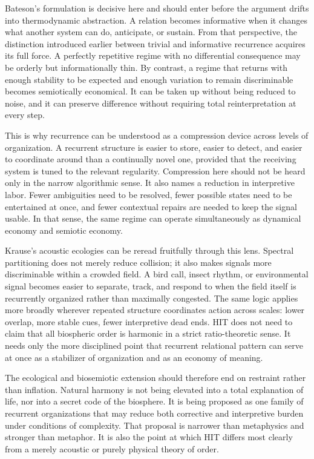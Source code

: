 Bateson's formulation is decisive here and should enter before the argument drifts into thermodynamic abstraction. A relation becomes informative when it changes what another system can do, anticipate, or sustain. From that perspective, the distinction introduced earlier between trivial and informative recurrence acquires its full force. A perfectly repetitive regime with no differential consequence may be orderly but informationally thin. By contrast, a regime that returns with enough stability to be expected and enough variation to remain discriminable becomes semiotically economical. It can be taken up without being reduced to noise, and it can preserve difference without requiring total reinterpretation at every step.

This is why recurrence can be understood as a compression device across levels of organization. A recurrent structure is easier to store, easier to detect, and easier to coordinate around than a continually novel one, provided that the receiving system is tuned to the relevant regularity. Compression here should not be heard only in the narrow algorithmic sense. It also names a reduction in interpretive labor. Fewer ambiguities need to be resolved, fewer possible states need to be entertained at once, and fewer contextual repairs are needed to keep the signal usable. In that sense, the same regime can operate simultaneously as dynamical economy and semiotic economy.

Krause's acoustic ecologies can be reread fruitfully through this lens. Spectral partitioning does not merely reduce collision; it also makes signals more discriminable within a crowded field. A bird call, insect rhythm, or environmental signal becomes easier to separate, track, and respond to when the field itself is recurrently organized rather than maximally congested. The same logic applies more broadly wherever repeated structure coordinates action across scales: lower overlap, more stable cues, fewer interpretive dead ends. HIT does not need to claim that all biospheric order is harmonic in a strict ratio-theoretic sense. It needs only the more disciplined point that recurrent relational pattern can serve at once as a stabilizer of organization and as an economy of meaning.

The ecological and biosemiotic extension should therefore end on restraint rather than inflation. Natural harmony is not being elevated into a total explanation of life, nor into a secret code of the biosphere. It is being proposed as one family of recurrent organizations that may reduce both corrective and interpretive burden under conditions of complexity. That proposal is narrower than metaphysics and stronger than metaphor. It is also the point at which HIT differs most clearly from a merely acoustic or purely physical theory of order.

